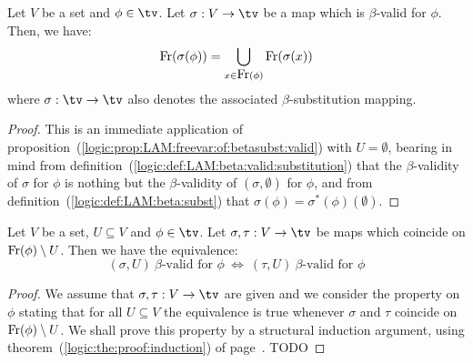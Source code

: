 \begin{prop}\label{logic:prop:LAM:freevar:of:betasubst:valid}
    Let $V$ be a set and $\phi\in\tv$. Let $\sigma:V\to\tv$ be a map which is 
    $\beta$-valid for $\phi$. Then, we have: 
    \[
        \mbox{\rm Fr}(\sigma(\phi))
        =
        \bigcup_{x\in\mbox{\rm Fr}(\phi)}\mbox{\rm Fr}(\sigma(x))
    \]
    where $\sigma:\tv\to\tv$ also denotes the associated $\beta$-substitution
    mapping.
\end{prop}
\begin{proof}
    This is an immediate application of
    proposition~(\ref{logic:prop:LAM:freevar:of:betasubst:valid}) with
    $U=\emptyset$, bearing in mind from
    definition~(\ref{logic:def:LAM:beta:valid:substitution}) that the 
    $\beta$-validity of $\sigma$ for $\phi$ is nothing but the $\beta$-validity
    of $(\sigma,\emptyset)$ for $\phi$, and from
    definition~(\ref{logic:def:LAM:beta:subst}) that $\sigma(\phi)=
    \sigma^{*}(\phi)(\emptyset)$.
\end{proof}

\begin{prop}\label{logic:prop:LAM:free:support:beta:valid}
    Let $V$ be a set, $U\subseteq V$ and $\phi\in\tv$. Let $\sigma,\tau:V\to\tv$ be maps
    which coincide on $\mbox{\rm Fr}(\phi)\setminus U$. Then we have the equivalence:
        \[
            (\sigma,U)\ \mbox{$\beta$-valid for $\phi$}\ 
            \Leftrightarrow\
            (\tau,U)\ \mbox{$\beta$-valid for $\phi$}
        \]
\end{prop}
\begin{proof}
    We assume that $\sigma,\tau:V\to\tv$ are given and we consider the property 
    on $\phi$ stating that for all $U\subseteq V$ the equivalence is true whenever
    $\sigma$ and $\tau$ coincide on $\mbox{\rm Fr}(\phi)\setminus U$. We shall prove
    this property by a structural induction argument, using 
    theorem~(\ref{logic:the:proof:induction})
    of page~\pageref{logic:the:proof:induction}. 
    TODO
\end{proof}

